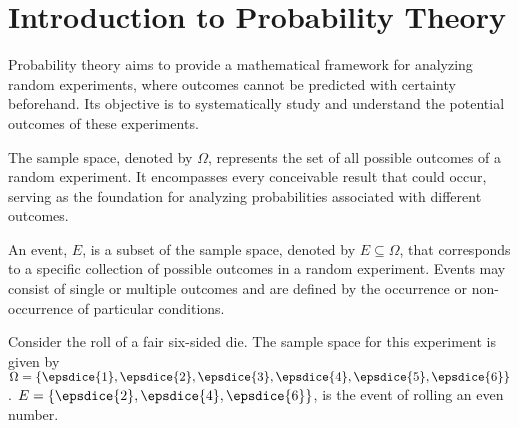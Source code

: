 \chapter{Introduction to Probability Theory}
\label{chp:probaiblity_theory}
Probability theory aims to provide a mathematical framework for analyzing random experiments, where outcomes cannot be predicted with certainty beforehand. Its objective is to systematically study and understand the potential outcomes of these experiments. 
\begin{definition}
	The sample space, denoted by \( \Omega \), represents the set of all possible outcomes of a random experiment. It encompasses every conceivable result that could occur, serving as the foundation for analyzing probabilities associated with different outcomes.
\end{definition}

\begin{definition}[Event]
	An event, $E$, is a subset of the sample space, denoted by $E \subseteq \Omega$, that corresponds to a specific collection of possible outcomes in a random experiment. Events may consist of single or multiple outcomes and are defined by the occurrence or non-occurrence of particular conditions.
\end{definition}

\begin{example}
	\label{ex:die1}
	Consider the roll of a fair six-sided die. The sample space for this experiment is given by $\Omega = \{ \epsdice{1}, \epsdice{2}, \epsdice{3}, \epsdice{4}, \epsdice{5}, \epsdice{6} \}$. $E = \{\epsdice{2}, \epsdice{4}, \epsdice{6}\}$, is the event of rolling an even number. 
\end{example}

